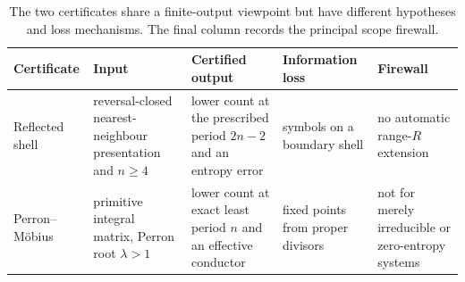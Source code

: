 \begin{table}[t]
\caption{The two certificates share a finite-output viewpoint but have
different hypotheses and loss mechanisms.  The final column records the
principal scope firewall.}
\label{tab:certificates}
\centering
\small
\renewcommand{\arraystretch}{1.12}
\begin{tabularx}{\textwidth}{@{}>{\raggedright\arraybackslash}p{}
  >{\raggedright\arraybackslash}p{}
  >{\raggedright\arraybackslash}p{}
  >{\raggedright\arraybackslash}p{}
  >{\raggedright\arraybackslash}X@{}}
\toprule
Certificate & Input & Certified output & Information loss & Firewall \\
\midrule
Reflected shell & reversal-closed nearest-neighbour presentation and $n\ge4$
& lower count at the prescribed period $2n-2$ and an entropy error
& symbols on a boundary shell
& no automatic range-$R$ extension \\
Perron--M\"obius & primitive integral matrix, Perron root $\lambda>1$
& lower count at exact least period $n$ and an effective conductor
& fixed points from proper divisors
& not for merely irreducible or zero-entropy systems \\
\bottomrule
\end{tabularx}
\end{table}
